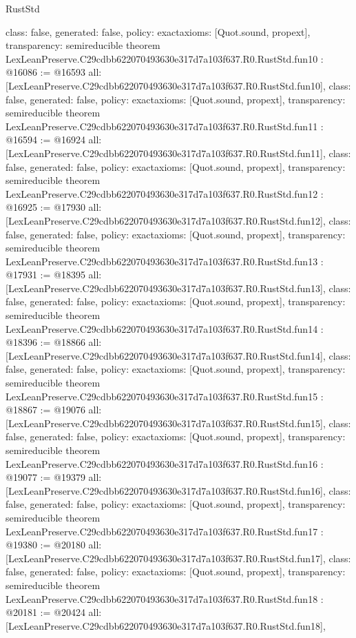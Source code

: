 \begin{lexlean}{RustStd}
\begin{coremodule}
{  class: false,
  generated: false,
  policy: exact{axioms: [Quot.sound, propext]},
  transparency: semireducible
}
theorem LexLeanPreserve.C29cdbb622070493630e317d7a103f637.R0.RustStd.fun10 : @16086 := @16593 {
  all: [LexLeanPreserve.C29cdbb622070493630e317d7a103f637.R0.RustStd.fun10],
  class: false,
  generated: false,
  policy: exact{axioms: [Quot.sound, propext]},
  transparency: semireducible
}
theorem LexLeanPreserve.C29cdbb622070493630e317d7a103f637.R0.RustStd.fun11 : @16594 := @16924 {
  all: [LexLeanPreserve.C29cdbb622070493630e317d7a103f637.R0.RustStd.fun11],
  class: false,
  generated: false,
  policy: exact{axioms: [Quot.sound, propext]},
  transparency: semireducible
}
theorem LexLeanPreserve.C29cdbb622070493630e317d7a103f637.R0.RustStd.fun12 : @16925 := @17930 {
  all: [LexLeanPreserve.C29cdbb622070493630e317d7a103f637.R0.RustStd.fun12],
  class: false,
  generated: false,
  policy: exact{axioms: [Quot.sound, propext]},
  transparency: semireducible
}
theorem LexLeanPreserve.C29cdbb622070493630e317d7a103f637.R0.RustStd.fun13 : @17931 := @18395 {
  all: [LexLeanPreserve.C29cdbb622070493630e317d7a103f637.R0.RustStd.fun13],
  class: false,
  generated: false,
  policy: exact{axioms: [Quot.sound, propext]},
  transparency: semireducible
}
theorem LexLeanPreserve.C29cdbb622070493630e317d7a103f637.R0.RustStd.fun14 : @18396 := @18866 {
  all: [LexLeanPreserve.C29cdbb622070493630e317d7a103f637.R0.RustStd.fun14],
  class: false,
  generated: false,
  policy: exact{axioms: [Quot.sound, propext]},
  transparency: semireducible
}
theorem LexLeanPreserve.C29cdbb622070493630e317d7a103f637.R0.RustStd.fun15 : @18867 := @19076 {
  all: [LexLeanPreserve.C29cdbb622070493630e317d7a103f637.R0.RustStd.fun15],
  class: false,
  generated: false,
  policy: exact{axioms: [Quot.sound, propext]},
  transparency: semireducible
}
theorem LexLeanPreserve.C29cdbb622070493630e317d7a103f637.R0.RustStd.fun16 : @19077 := @19379 {
  all: [LexLeanPreserve.C29cdbb622070493630e317d7a103f637.R0.RustStd.fun16],
  class: false,
  generated: false,
  policy: exact{axioms: [Quot.sound, propext]},
  transparency: semireducible
}
theorem LexLeanPreserve.C29cdbb622070493630e317d7a103f637.R0.RustStd.fun17 : @19380 := @20180 {
  all: [LexLeanPreserve.C29cdbb622070493630e317d7a103f637.R0.RustStd.fun17],
  class: false,
  generated: false,
  policy: exact{axioms: [Quot.sound, propext]},
  transparency: semireducible
}
theorem LexLeanPreserve.C29cdbb622070493630e317d7a103f637.R0.RustStd.fun18 : @20181 := @20424 {
  all: [LexLeanPreserve.C29cdbb622070493630e317d7a103f637.R0.RustStd.fun18],
}
\end{coremodule}
\end{lexlean}
